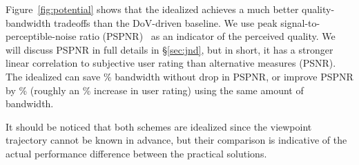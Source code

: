 Figure~\ref{fig:potential} shows that the idealized \vrvideo achieves a much better quality-bandwidth tradeoffs than the DoV-driven baseline.
We use peak signal-to-perceptible-noise ratio (PSPNR)~\cite{??} as an indicator of the perceived quality. 
We will discuss PSPNR in full details in \S\ref{sec:jnd}, but in short, it has a stronger linear correlation to subjective user rating than alternative measures (\eg PSNR).
The idealized \vrvideo can save \fillme\% bandwidth without drop in PSPNR, or improve PSPNR by \fillme\% (roughly an \fillme\% increase in user rating) using the same amount of bandwidth.

It should be noticed that both schemes are idealized since the viewpoint trajectory cannot be known in advance, but their comparison is indicative of the actual performance difference between the practical solutions. 


%
%
%
%


